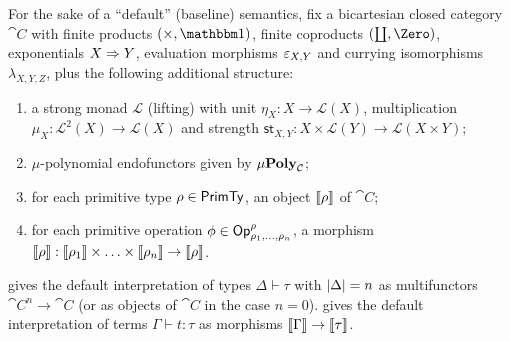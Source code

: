 For the sake of a ``default'' (baseline) semantics, fix a bicartesian closed category $\cat{C}$ with finite
products $(\times, \One)$, finite coproducts $(\coprod, \Zero)$, exponentials $X \Rightarrow Y$, evaluation
morphisms $\varepsilon_{X,Y}$ and currying isomorphisms $\lambda_{X,Y,Z}$, plus the following additional structure:
\begin{enumerate}
\item a strong monad $\mathcal{L}$ (lifting) with unit $\eta_X: X \to \mathcal{L}(X)$, multiplication $\mu_X:
\mathcal{L}^2(X) \to \mathcal{L}(X)$ and strength $\mathsf{st}_{X,Y}: X \times \mathcal{L}(Y) \to
\mathcal{L}(X \times Y)$;
\item $\mu$-polynomial endofunctors given by $\mu\mathbf{Poly}_{\mathcal{C}}$;
\item for each primitive type $\rho \in \mathsf{PrimTy}$, an object $\llbracket \rho \rrbracket$ of $\cat{C}$;
\item for each primitive operation $\phi \in \mathsf{Op}^\rho_{\rho_1,\ldots,\rho_n}$, a morphism $\llbracket \rho \rrbracket:
\llbracket \rho_1 \rrbracket \times \ldots \times \llbracket \rho_n \rrbracket \to \llbracket \rho \rrbracket$.
\end{enumerate}
 gives the default interpretation of types $\Delta \vdash \tau$ with
$|\Delta| = n$ as multifunctors $\cat{C}^n \to \cat{C}$ (or as objects of $\cat{C}$ in the case $n =
0$).  gives the default interpretation of terms $\Gamma \vdash t: \tau$ as
morphisms $\llbracket \Gamma \rrbracket \to \llbracket \tau \rrbracket$.
